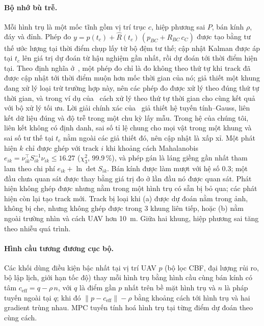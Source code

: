 \documentclass[11pt,a4paper]{article}
\theoremstyle{plain}
\theoremstyle{definition}
\theoremstyle{remark}
\begin{document}
\paragraph{Bộ nhớ bù trễ.} Mỗi hình trụ là một mốc tĩnh gồm vị trí trục $c$, hiệp phương sai $P$, bán kính $\rho$, đáy và đỉnh. Phép đo $y = \hat p(t_c) + \hat R(t_c)\,(p_{BC} + R_{BC}\,c_C)$ được tạo bằng tư thế ước lượng tại thời điểm chụp lấy từ bộ đệm tư thế; cập nhật Kalman được áp tại $t_c$ lên giá trị dự đoán từ hậu nghiệm gần nhất, rồi dự đoán tới thời điểm hiện tại. Theo định nghĩa ở~\cite{barshalom2002}, một phép đo chỉ là đo không theo thứ tự khi track đã được cập nhật tới thời điểm muộn hơn mốc thời gian của nó; giả thiết một khung đang xử lý loại trừ trường hợp này, nên các phép đo được xử lý theo đúng thứ tự thời gian, và trong ví dụ của~\cite{barshalom2002} cách xử lý theo thứ tự thời gian cho cùng kết quả với bộ xử lý tối ưu. Lời giải chính xác của~\cite{barshalom2002} giả thiết hệ tuyến tính--Gauss, liên kết dữ liệu đúng và độ trễ trong một chu kỳ lấy mẫu. Trong hệ của chúng tôi, liên kết không có định danh, sai số tỉ lệ chung cho mọi vật trong một khung và sai số tư thế tại $t_c$ nằm ngoài các giả thiết đó, nên cập nhật là xấp xỉ. Một phát hiện $k$ chỉ được ghép với track $i$ khi khoảng cách Mahalanobis $e_{ik} = \nu_{ik}^\top S_{ik}^{-1}\nu_{ik} \le 16.27$ ($\chi^2_3$, 99.9\,\%), và phép gán là láng giềng gần nhất tham lam theo chi phí $e_{ik} + \ln\det S_{ik}$. Bán kính được làm mượt với hệ số 0.3; một đầu chưa quan sát được thay bằng giá trị đo ở lần đầu nó được quan sát. Phát hiện không ghép được nhưng nằm trong một hình trụ có sẵn bị bỏ qua; các phát hiện còn lại tạo track mới. Track bị loại khi (a) được dự đoán nằm trong ảnh, không bị che, nhưng không ghép được trong 3 khung liên tiếp, hoặc (b) nằm ngoài trường nhìn và cách UAV hơn 10~m. Giữa hai khung, hiệp phương sai tăng theo nhiễu quá trình.

\paragraph{Hình cầu tương đương cục bộ.} Các khối dùng điều kiện bậc nhất tại vị trí UAV $p$ (bộ lọc CBF, đại lượng rủi ro, bộ lập lịch, giới hạn tốc độ) thay mỗi hình trụ bằng hình cầu cùng bán kính có tâm $c_{\mathrm{eff}} = q - \rho\,n$, với $q$ là điểm gần $p$ nhất trên bề mặt hình trụ và $n$ là pháp tuyến ngoài tại $q$; khi đó $\|p - c_{\mathrm{eff}}\| - \rho$ bằng khoảng cách tới hình trụ và hai gradient trùng nhau. MPC tuyến tính hoá hình trụ tại từng điểm dự đoán theo cùng cách.
\end{document}
